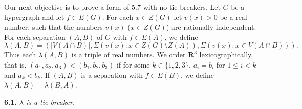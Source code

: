 
Our next objective is to prove a form of 5.7 with no tie-breakers. Let $G$ be a hypergraph and let $f \in E(G)$. For each $x \in Z(G)$ let $v(x) > 0$ be a real number, such that the numbers $v(x)$ ($x \in Z(G)$) are rationally independent. For each separation $(A, B)$ of $G$ with $f \in E(A)$, we define
\begin{equation*}
\lambda(A, B) = (|V(A \cap B)|, \Sigma(v(x) : x \in Z(G) \setminus Z(A)), \Sigma(v(x) : x \in V(A \cap B))).
\end{equation*}
Thus each $\lambda(A, B)$ is a triple of real numbers. We order $\mathbf{R}^3$ lexicographically, that is, $(a_1, a_2, a_3) < (b_1, b_2, b_3)$ if for some $k \in \{1, 2, 3\}$, $a_i = b_i$ for $1 \le i < k$ and $a_k < b_k$. If $(A, B)$ is a separation with $f \in E(B)$, we define $\lambda(A, B) = \lambda(B, A)$.

\textbf{6.1.} \textit{$\lambda$ is a tie-breaker.}
